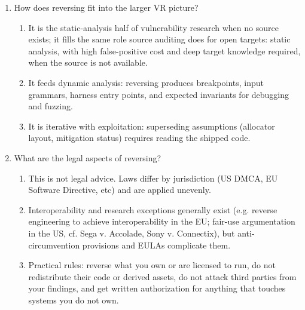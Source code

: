 \documentclass[12pt]{Training}
\begin{document}
\begin{enumerate}
\begin{enumerate}
    \end{enumerate}
    \item How does reversing fit into the larger VR picture?
    \begin{enumerate}
        \item It is the static-analysis half of vulnerability research when no source exists; it fills the same role source auditing does for open targets: static analysis, with high false-positive cost and deep target knowledge required, when the source is not available.
        \item It feeds dynamic analysis: reversing produces breakpoints, input grammars, harness entry points, and expected invariants for debugging and fuzzing.
        \item It is iterative with exploitation: superseding assumptions (allocator layout, mitigation status) requires reading the shipped code.
    \end{enumerate}
    \item What are the legal aspects of reversing?
    \begin{enumerate}
        \item This is not legal advice. Laws differ by jurisdiction (US DMCA, EU Software Directive, etc) and are applied unevenly.
        \item Interoperability and research exceptions generally exist (e.g. reverse engineering to achieve interoperability in the EU; fair-use argumentation in the US, cf. Sega v. Accolade, Sony v. Connectix), but anti-circumvention provisions and EULAs complicate them.
        \item Practical rules: reverse what you own or are licensed to run, do not redistribute their code or derived assets, do not attack third parties from your findings, and get written authorization for anything that touches systems you do not own.
    \end{enumerate}
\end{enumerate}
\end{document}
